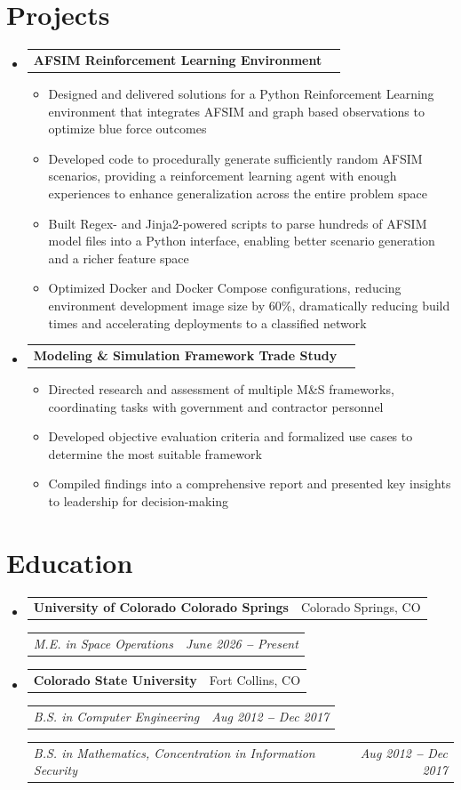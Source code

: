 \documentclass[letterpaper,11pt]{article}
\makeatletter
\newenvironment{entries}
  {\begin{itemize}[leftmargin=0.15in, label={}, topsep=0pt, parsep=0pt, itemsep=0pt]}
  {\end{itemize}}
\newenvironment{bullets}
  {\vspace{-10pt}\begin{itemize}[topsep=0pt, partopsep=0pt]\small}
  {\end{itemize}}
\newcommand{\heading}[2]{
  \vspace{4pt}\item
    \begin{tabular*}{0.97\textwidth}[t]{l@{\extracolsep{\fill}}r}
      \textbf{#1} & \small#2 \\
    \end{tabular*}
}
\newcommand{\subtitle}[2]{
    \vspace{2pt}
    \begin{tabular*}{0.97\textwidth}[t]{l@{\extracolsep{\fill}}r}
      \textit{\small#1} & \textit{\small #2} \\
    \end{tabular*}
}
\makeatother
\begin{document}

\section{Projects}
\vspace{2pt}
\begin{entries}

  \heading{AFSIM Reinforcement Learning Environment}{}
  \begin{bullets}
    \item Designed and delivered solutions for a Python Reinforcement Learning environment that integrates AFSIM and graph based observations to optimize blue force outcomes
    \item Developed code to procedurally generate sufficiently random AFSIM scenarios, providing a reinforcement learning agent with enough experiences to enhance generalization across the entire problem space
    \item Built Regex- and Jinja2-powered scripts to parse hundreds of AFSIM model files into a Python interface, enabling better scenario generation and a richer feature space
    \item Optimized Docker and Docker Compose configurations, reducing environment development image size by 60\%, dramatically reducing build times and accelerating deployments to a classified network
  \end{bullets}

  \heading{Modeling \& Simulation Framework Trade Study}{}
  \begin{bullets}
    \item Directed research and assessment of multiple M\&S frameworks, coordinating tasks with government and contractor personnel
    \item Developed objective evaluation criteria and formalized use cases to determine the most suitable framework
    \item Compiled findings into a comprehensive report and presented key insights to leadership for decision-making
  \end{bullets}

\end{entries}


\section{Education}
\vspace{2pt}
\begin{entries}

  \heading{University of Colorado Colorado Springs}{Colorado Springs, CO}
  \subtitle{M.E. in Space Operations}{June 2026 \textbf{--} Present}

  \heading{Colorado State University}{Fort Collins, CO}
  \subtitle{B.S. in Computer Engineering}{Aug 2012 \textbf{--} Dec 2017}
  \subtitle{B.S. in Mathematics, Concentration in Information Security}{Aug 2012 \textbf{--} Dec 2017}

\end{entries}
\end{document}
